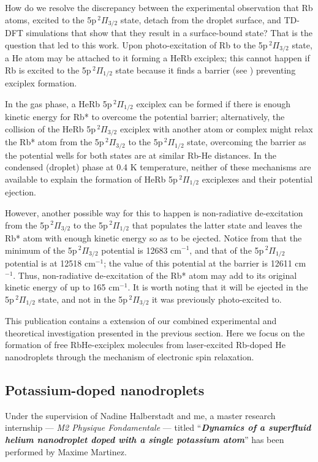 		How do we resolve the discrepancy between the experimental observation that Rb atoms, excited to the 5p$\,^2\Pi_{3/2}$ state, detach from the droplet surface, and TD-DFT simulations that show that they result in a surface-bound state? That is the question that led to this work. Upon photo-excitation of Rb to the 5p$\,^2\Pi_{3/2}$ state, a He atom may be attached to it forming a HeRb exciplex; this cannot happen if Rb is excited to the 5p$\,^2\Pi_{1/2}$ state because it finds a barrier (see ) preventing exciplex formation.

		In the gas phase, a HeRb 5p$\,^2\Pi_{1/2}$ exciplex can be formed if there is enough kinetic energy for Rb* to overcome the potential barrier; alternatively, the collision of the HeRb 5p$\,^2\Pi_{3/2}$ exciplex with another atom or complex might relax the Rb* atom from the 5p$\,^2\Pi_{3/2}$ to the 5p$\,^2\Pi_{1/2}$ state, overcoming the barrier as the potential wells for both states are at similar Rb-He distances. In the condensed (droplet) phase at 0.4 K temperature, neither of these mechanisms are available to explain the formation of HeRb 5p$\,^2\Pi_{1/2}$ exciplexes and their potential ejection.

		However, another possible way for this to happen is non-radiative de-excitation from the 5p$\,^2\Pi_{3/2}$ to the 5p$\,^2\Pi_{1/2}$ that populates the latter state and leaves the Rb* atom with enough kinetic energy so as to be ejected. Notice from  that the minimum of the 5p$\,^2\Pi_{3/2}$ potential is 12683 cm$^{-1}$, and that of the 5p$\,^2\Pi_{1/2}$ potential is at 12518 cm$^{-1}$; the value of this potential at the barrier is 12611 cm$^{-1}$. Thus, non-radiative de-excitation of the Rb* atom may add to its original kinetic energy of up to 165 cm$^{-1}$. It is worth noting that it will be ejected in the 5p$\,^2\Pi_{1/2}$ state, and not in the 5p$\,^2\Pi_{3/2}$ it was previously photo-excited to.

		This publication contains a extension of our combined experimental and theoretical investigation presented in the previous section. Here we focus on the formation of free RbHe-exciplex molecules from laser-excited Rb-doped He nanodroplets through the mechanism of electronic spin relaxation.
		
	\subsection*{Potassium-doped nanodroplets}
		Under the supervision of Nadine Halberstadt and me, a master research internship --- \emph{M2 Physique Fondamentale} --- titled ``\emph{\textbf{Dynamics of a superfluid helium nanodroplet doped with a single potassium atom}}'' has been performed by Maxime Martinez.

